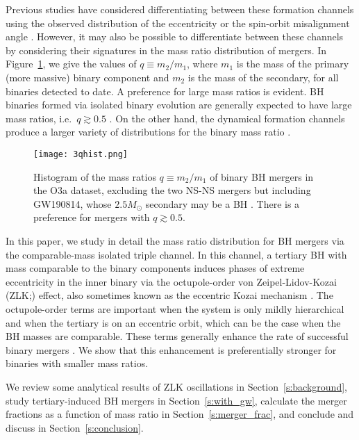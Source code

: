\documentclass[
        fleqn,
        usenatbib,
    ]{mnras}
\newlength{\colummwidth}
\begin{document}
Previous studies have considered differentiating between these formation
channels using the observed distribution of the eccentricity \citep[e.g.][]{LL18,
LL19} or the spin-orbit misalignment angle \citep[e.g.][]{LL18, su2020spin}.
However, it may also be possible to differentiate between these channels by
considering their signatures in the mass ratio distribution of mergers. In
Figure~\ref{fig:qhist}, we give the values of $q \equiv m_2 / m_1$, where $m_1$
is the mass of the primary (more massive) binary component and $m_2$ is the mass
of the secondary, for all binaries detected to date. A preference for large mass
ratios is evident. BH binaries formed via isolated binary evolution are
generally expected to have large mass ratios, i.e.\ $q \gtrsim 0.5$
\citep{belczynski2016first, olejak2020}. On the other hand, the dynamical
formation channels produce a larger variety of distributions for the binary mass
ratio \citep[e.g.][]{silsbee2017lidov, fragione2019}.

\begin{figure}
    \centering
    \texttt{[image: 3qhist.png]}
    \caption{Histogram of the mass ratios $q \equiv m_2 / m_1$ of binary BH
    mergers in the O3a dataset, excluding the two NS-NS mergers but including
    GW190814, whose $2.5M_{\odot}$ secondary may be a BH \citep{LIGOO3a}. There
    is a preference for mergers with $q \gtrsim 0.5$.
    }\label{fig:qhist}
\end{figure}

In this paper, we study in detail the mass ratio distribution for BH mergers via
the comparable-mass isolated triple channel. In this channel, a tertiary BH with
mass comparable to the binary components induces phases of extreme
eccentricity in the inner binary via the octupole-order von Zeipel-Lidov-Kozai
(ZLK;\@\citealp{zeipel, lidov, kozai}) effect, also sometimes known as the
eccentric Kozai mechanism \citep[e.g.][]{lithwick2011eccentric}. The
octupole-order terms are important when the system is only mildly hierarchical
and when the tertiary is on an eccentric orbit, which can be the case when the
BH masses are comparable. These terms generally enhance the rate of successful
binary mergers \citep{LL18}. We show that this enhancement is preferentially
stronger for binaries with smaller mass ratios.

We review some analytical results of ZLK oscillations in
Section~\ref{s:background}, study tertiary-induced BH mergers in
Section~\ref{s:with_gw}, calculate the merger fractions as a function of mass
ratio in Section~\ref{s:merger_frac}, and conclude and discuss in
Section~\ref{s:conclusion}.
\end{document}
